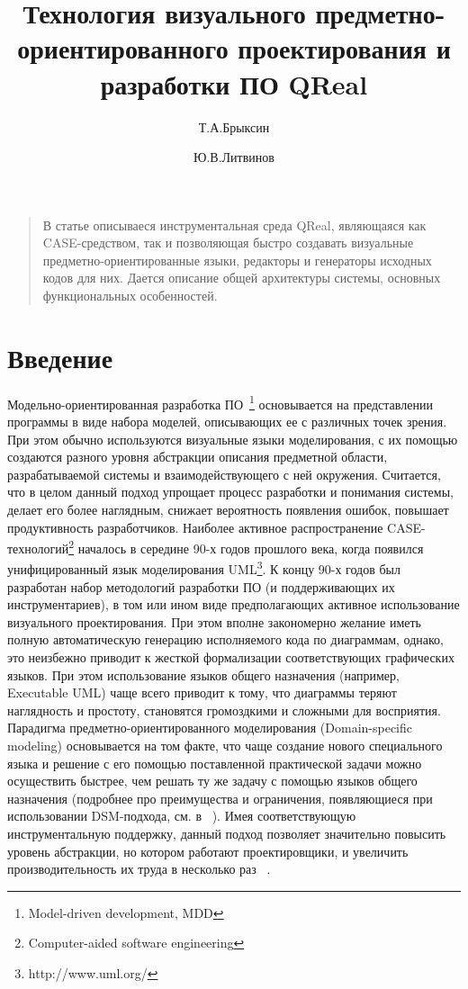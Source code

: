 \documentclass[a4paper]{article}
\title{Технология визуального предметно-ориентированного проектирования и разработки ПО QReal}
\author{Т.А.Брыксин \and Ю.В.Литвинов}
\date{}
\begin{document}
\maketitle
\thispagestyle{empty}

\begin{quote}
\small\noindent
В статье описываеся инструментальная среда QReal, являющаяся как CASE-средством, так и позволяющая быстро создавать визуальные предметно-ориентированные языки, редакторы и генераторы исходных кодов для них. Дается описание общей архитектуры системы, основных функциональных особенностей. 
\end{quote}

\section*{Введение}

Модельно-ориентированная разработка ПО~\footnote{Model-driven development, MDD} основывается на представлении программы в виде набора моделей, описывающих ее с различных точек зрения. При этом обычно используются визуальные языки моделирования, с их помощью создаются разного уровня абстракции описания предметной области, разрабатываемой системы и взаимодействующего с ней окружения. Считается, что в целом данный подход упрощает процесс разработки и понимания системы, делает его более наглядным, снижает вероятность появления ошибок, повышает продуктивность разработчиков. Наиболее активное распространение CASE-технологий\footnote{Computer-aided software engineering}  началось в середине 90-х годов прошлого века, когда появился унифицированный язык моделирования UML\footnote{http://www.uml.org/}. К концу 90-х годов был разработан набор методологий разработки ПО (и поддерживающих их инструментариев), в том или ином виде предполагающих активное использование визуального проектирования. При этом вполне закономерно желание иметь полную автоматическую генерацию исполняемого кода по диаграммам, однако, это неизбежно приводит к жесткой формализации соответствующих графических языков. При этом использование языков общего назначения (например, Executable UML) чаще всего приводит к тому, что диаграммы теряют наглядность и простоту, становятся громоздкими и сложными для восприятия. Парадигма предметно-ориентированного моделирования (Domain-specific modeling) основывается на том факте, что чаще создание нового специального языка и решение с его помощью поставленной практической задачи можно осуществить быстрее, чем решать ту же задачу с помощью языков общего назначения (подробнее про преимущества и ограничения, появляющиеся при использовании DSM-подхода, см. в ~\cite{theBook}). Имея соответствующую инструментальную поддержку, данный подход позволяет значительно повысить уровень абстракции, но котором работают проектировщики, и увеличить производительность их труда в несколько раз ~\cite{dsm01}.
\end{document}
